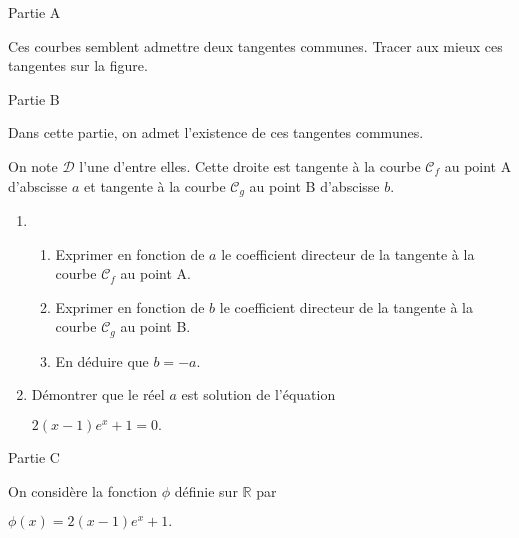 \begin{center}
\end{center}
\begin{h3}Partie A\end{h3}
Ces courbes semblent admettre deux tangentes communes. Tracer aux mieux ces tangentes sur la figure.
\begin{h3}Partie B\end{h3}
Dans cette partie, on admet l'existence de ces tangentes communes.
\par
On note $\mathscr D$ l'une d'entre elles. Cette droite est tangente à la courbe $\mathscr C_{f}$ au point A d'abscisse $a$ et tangente à la courbe $\mathscr C_{g}$ au point B d'abscisse $b$.
\begin{enumerate}
     \item
     \begin{enumerate}[label=\alph*.]
          \item
          Exprimer en fonction de $a$ le coefficient directeur de la tangente à la courbe $\mathscr C_{f}$ au point A.
          \item
          Exprimer en fonction de $b$ le coefficient directeur de la tangente à la courbe $\mathscr C_{g}$ au point B.
          \item
     En déduire que $b =-a$.\end{enumerate}
     \item
     Démontrer que le réel $a$ est solution de l'équation
     \begin{center}$2\left( x -1\right)e^{x}+1=0.$\end{center}
\end{enumerate}
\begin{h3}Partie C\end{h3}
On considère la fonction $\phi $ définie sur  $\mathbb{R}$ par
\begin{center}$\phi \left(x\right)=2\left(x -1\right)e^{x}+1.$\end{center}
